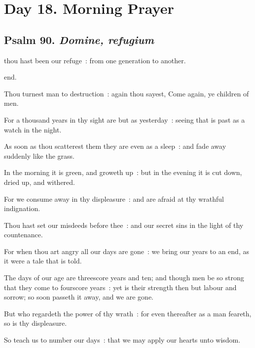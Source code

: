\section*{Day 18. Morning Prayer}

\subsection{Psalm 90. \textit{Domine, refugium}}


 thou hast been our refuge~: from one generation to another.\par
\noindent
end.\par
{}Thou turnest man to destruction~: again thou sayest, Come again, ye children of men.\par
{}For a thousand years in thy sight are but as yesterday~: seeing that is past as a watch in the night.\par
{}As soon as thou scatterest them they are even as a sleep~: and fade away suddenly like the grass.\par
{}In the morning it is green, and groweth up~: but in the evening it is cut down, dried up, and withered.\par
{}For we consume away in thy displeasure~: and are afraid at thy wrathful indignation.\par
{}Thou hast set our misdeeds before thee~: and our secret sins in the light of thy countenance.\par
{}For when thou art angry all our days are gone~: we bring our years to an end, as it were a tale that is told.\par
{}The days of our age are threescore years and ten; and though men be so strong that they come to fourscore years~: yet is their strength then but labour and sorrow; so soon passeth it away, and we are gone.\par
{}But who regardeth the power of thy wrath~: for even thereafter as a man feareth, so is thy displeasure.\par
{}So teach us to number our days~: that we may apply our hearts unto wisdom.\par
